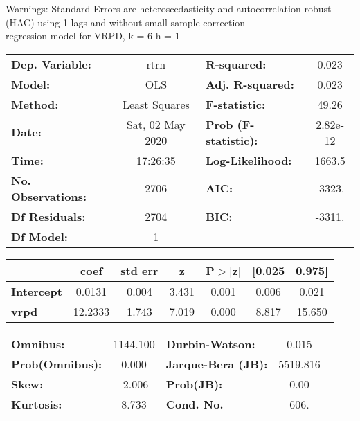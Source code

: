 Warnings: \newline
 [1] Standard Errors are heteroscedasticity and autocorrelation robust (HAC) using 1 lags and without small sample correction\\ 

regression model for VRPD, k = 6 h = 1\begin{center}
\begin{tabular}{lclc}
\toprule
\textbf{Dep. Variable:}    &       rtrn       & \textbf{  R-squared:         } &     0.023   \\
\textbf{Model:}            &       OLS        & \textbf{  Adj. R-squared:    } &     0.023   \\
\textbf{Method:}           &  Least Squares   & \textbf{  F-statistic:       } &     49.26   \\
\textbf{Date:}             & Sat, 02 May 2020 & \textbf{  Prob (F-statistic):} &  2.82e-12   \\
\textbf{Time:}             &     17:26:35     & \textbf{  Log-Likelihood:    } &    1663.5   \\
\textbf{No. Observations:} &        2706      & \textbf{  AIC:               } &    -3323.   \\
\textbf{Df Residuals:}     &        2704      & \textbf{  BIC:               } &    -3311.   \\
\textbf{Df Model:}         &           1      & \textbf{                     } &             \\
\bottomrule
\end{tabular}
\begin{tabular}{lcccccc}
                   & \textbf{coef} & \textbf{std err} & \textbf{z} & \textbf{P$> |$z$|$} & \textbf{[0.025} & \textbf{0.975]}  \\
\midrule
\textbf{Intercept} &       0.0131  &        0.004     &     3.431  &         0.001        &        0.006    &        0.021     \\
\textbf{vrpd}      &      12.2333  &        1.743     &     7.019  &         0.000        &        8.817    &       15.650     \\
\bottomrule
\end{tabular}
\begin{tabular}{lclc}
\textbf{Omnibus:}       & 1144.100 & \textbf{  Durbin-Watson:     } &    0.015  \\
\textbf{Prob(Omnibus):} &   0.000  & \textbf{  Jarque-Bera (JB):  } & 5519.816  \\
\textbf{Skew:}          &  -2.006  & \textbf{  Prob(JB):          } &     0.00  \\
\textbf{Kurtosis:}      &   8.733  & \textbf{  Cond. No.          } &     606.  \\
\bottomrule
\end{tabular}
\end{center}

